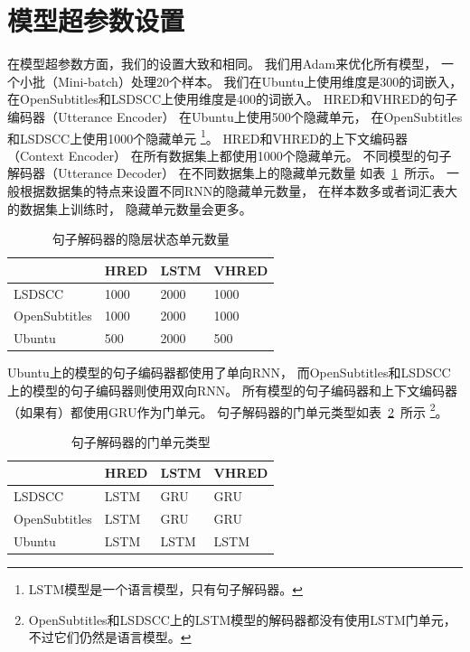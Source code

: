 \section{模型超参数设置}\label{sec:model_hparams}
在模型超参数方面，我们的设置大致和\cite{VHRED}相同。
我们用Adam来优化所有模型，
一个小批（Mini-batch）处理20个样本。
我们在Ubuntu上使用维度是300的词嵌入，
在OpenSubtitles和LSDSCC上使用维度是400的词嵌入。
HRED和VHRED的句子编码器（Utterance Encoder）
在Ubuntu上使用500个隐藏单元，
在OpenSubtitles和LSDSCC上使用1000个隐藏单元
\footnote{LSTM模型是一个语言模型，只有句子解码器。}。
HRED和VHRED的上下文编码器（Context Encoder）
在所有数据集上都使用1000个隐藏单元。
不同模型的句子解码器（Utterance Decoder）
在不同数据集上的隐藏单元数量
如表~\ref{tab:utterance_decoder_hidden_units}~所示。
一般根据数据集的特点来设置不同RNN的隐藏单元数量，
在样本数多或者词汇表大的数据集上训练时，
隐藏单元数量会更多。

\begin{table}[H]
    \centering
    \caption{句子解码器的隐层状态单元数量}
    \label{tab:utterance_decoder_hidden_units}
    \begin{tabular}{llll}
        \toprule
        & HRED & LSTM & VHRED \\
        \midrule
        LSDSCC & 1000 & 2000 & 1000 \\
        OpenSubtitles & 1000 & 2000 & 1000 \\
        Ubuntu & 500 & 2000 & 500 \\
        \bottomrule
    \end{tabular}
\end{table}

Ubuntu上的模型的句子编码器都使用了单向RNN，
而OpenSubtitles和LSDSCC上的模型的句子编码器则使用双向RNN。
所有模型的句子编码器和上下文编码器（如果有）都使用GRU作为门单元。
句子解码器的门单元类型如表~\ref{tab:utterance_decoder_gate_types}~所示
\footnote{OpenSubtitles和LSDSCC上的LSTM模型的解码器都没有使用LSTM门单元，不过它们仍然是语言模型。}。
\begin{table}[H]
    \centering
    \caption{句子解码器的门单元类型}
    \label{tab:utterance_decoder_gate_types}
    \begin{tabular}{llll}
        \toprule
        & HRED & LSTM & VHRED \\
        \midrule
        LSDSCC & LSTM & GRU & GRU \\
        OpenSubtitles & LSTM & GRU & GRU \\
        Ubuntu & LSTM & LSTM & LSTM \\
        \bottomrule
    \end{tabular}
\end{table}

